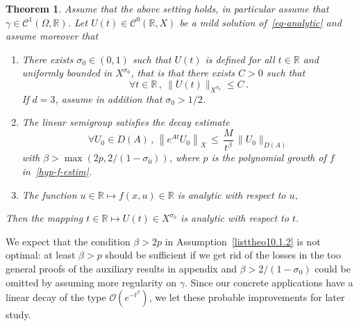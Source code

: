\documentclass[10pt]{amsart}
\newtheorem{theo}{Theorem}[section]
\theoremstyle{definition}\newtheorem{defi}[theo]{Definition}\newtheorem{rema}[theo]{Remark}\newtheorem{exam}[theo]{Example}\newtheorem{exem}[theo]{Example}\newtheorem{nota}[theo]{Notation}
\newcommand{\RR}{\mathbb{R}}
\newcommand{\Cc}{\mathcal{C}}
\newcommand{\Oc}{\mathcal{O}}
\newcommand*{\romanenumi}{\renewcommand*{\theenumi}{\roman{enumi}}}
\let\oldforall\forall
\renewcommand*{\forall}{\mathrel{\oldforall}}
\begin{document}
\begin{theo}\label{th-analytic}
Assume that the above setting holds, in particular assume that $\gamma\in \Cc^1(\Omega,\RR)$. Let $U(t)\in\Cc^0(\RR,X)$ be a mild solution of~\eqref{eq-analytic} and assume moreover that
\begin{enumerate}\romanenumi
\item \label{listtheo10.1.1}There exists $\sigma_0\in (0,1)$ such that $U(t)$ is defined for all $t\in\RR$ and uniformly bounded in $X^{\sigma_0}$, that is that there exists $C>0$ such that
\[
\forall t\in\RR\,,\:\|U(t)\|_{X^{\sigma_0}}\leq C\,.
\]
If $d=3$, assume in addition that $\sigma_0>1/2$.
\item \label{listtheo10.1.2}The linear semigroup satisfies the decay estimate
\begin{equation}\label{hyp-decay-analytic}
\forall U_0\in D(A)\,,\,\left\|e^{At}U_0\right\|_X\,\leq\,\frac M {t^{\beta}}\,\|U_0\|_{D(A)}
\end{equation}
with $\beta>\max(2p,2/(1-\sigma_0))$, where $p$ is the polynomial growth of $f$ in~\eqref{hyp-f-estim}.
\item \label{listtheo10.1.3}The function $u\in\RR \mapsto f(x,u)\in\RR$ is analytic with respect to $u$,
\end{enumerate}
Then the mapping $t\in\RR \mapsto U(t)\in X^{\sigma_0}$ is analytic with respect to $t$.
\end{theo}

We expect that the condition $\beta>2p$ in Assumption~\eqref{listtheo10.1.2} is not optimal: at least $\beta>p$ should be sufficient if we get rid of the losses in the too general proofs of the auxiliary results in appendix and $\beta>2/(1-\sigma_0)$ could be omitted by assuming more regularity on $\gamma$. Since our concrete applications have a linear decay of the type $\Oc(e^{-t^{\beta}})$, we let these probable improvements for later study.

\end{document}
